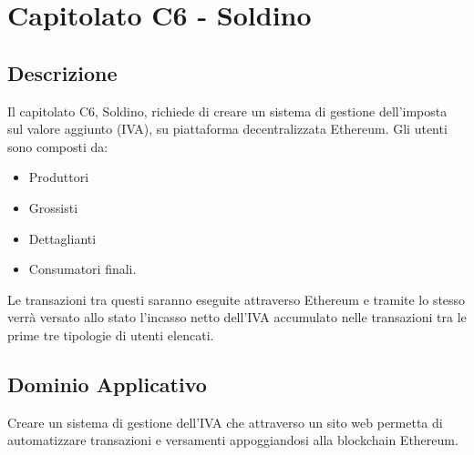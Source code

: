 \clearpage
\section{Capitolato C6 - Soldino}
\label{sec:c6}
\subsection{Descrizione}
Il capitolato C6, Soldino, richiede di creare un sistema di gestione dell'imposta sul valore aggiunto (IVA), su piattaforma decentralizzata Ethereum. Gli utenti sono composti da:
\begin{itemize}
\item Produttori 
\item Grossisti 
\item Dettaglianti 
\item Consumatori finali.
\end{itemize}
Le transazioni tra questi saranno eseguite attraverso Ethereum e tramite lo stesso verrà versato allo stato l'incasso netto dell'IVA accumulato nelle transazioni tra le prime tre tipologie di utenti elencati.

\subsection{Dominio Applicativo}
Creare un sistema di gestione dell'IVA che attraverso un sito web permetta di automatizzare transazioni e versamenti appoggiandosi alla blockchain Ethereum.

